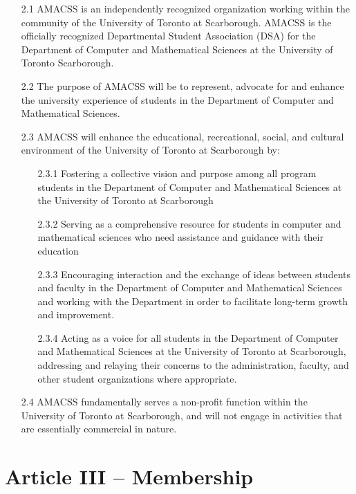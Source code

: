 \documentclass[12pt,a4paper]{article}
\begin{document}
\begin{enumerate}
\item[2.1] AMACSS is an independently recognized organization working within the community of the University of Toronto at Scarborough. AMACSS is the officially recognized Departmental Student Association (DSA) for the Department of Computer and Mathematical Sciences at the University of Toronto Scarborough.

\item[2.2] The purpose of AMACSS will be to represent, advocate for and enhance the university experience of students in the Department of Computer and Mathematical Sciences.

\item[2.3] AMACSS will enhance the educational, recreational, social, and cultural environment of the University of Toronto at Scarborough by:

\begin{enumerate}
\item[2.3.1] Fostering a collective vision and purpose among all program students in the Department of Computer and Mathematical Sciences at the University of Toronto at Scarborough

\item[2.3.2] Serving as a comprehensive resource for students in computer and mathematical sciences who need assistance and guidance with their education

\item[2.3.3] Encouraging interaction and the exchange of ideas between students and faculty in the Department of Computer and Mathematical Sciences and working with the Department in order to facilitate long-term growth and improvement.

\item[2.3.4] Acting as a voice for all students in the Department of Computer and Mathematical Sciences at the University of Toronto at Scarborough, addressing and relaying their concerns to the administration, faculty, and other student organizations where appropriate.
\end{enumerate}

\item[2.4] AMACSS fundamentally serves a non-profit function within the University of Toronto at Scarborough, and will not engage in activities that are essentially commercial in nature.
\end{enumerate}

\section*{Article III – Membership}
\end{document}
